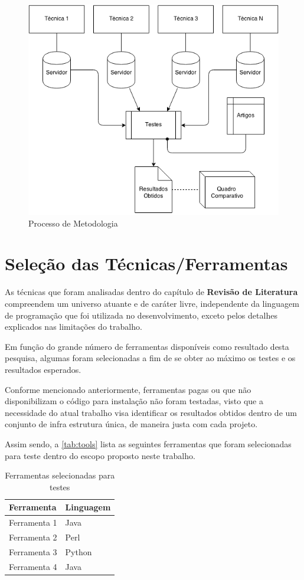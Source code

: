 \begin{figure}
    \centering
    \caption{Processo de Metodologia}
    \label{fig:metodology}
    \includegraphics[width=0.7\linewidth]{./assets/images/metodology}
\end{figure}


\section{Seleção das Técnicas/Ferramentas}
\label{sec:choosen-tools}

As técnicas que foram analisadas dentro do capítulo de \textbf{Revisão de Literatura} compreendem um universo atuante e de caráter livre, independente da linguagem de programação que foi utilizada no desenvolvimento, exceto pelos detalhes explicados nas limitações do trabalho.

Em função do grande número de ferramentas disponíveis como resultado desta pesquisa, algumas foram selecionadas a fim de se obter ao máximo os testes e os resultados esperados.

Conforme mencionado anteriormente, ferramentas pagas ou que não disponibilizam o código para instalação não foram testadas, visto que a necessidade do atual trabalho visa identificar os resultados obtidos dentro de um conjunto de infra estrutura única, de maneira justa com cada projeto.

Assim sendo, a \autoref{tab:tools} lista as seguintes ferramentas que foram selecionadas para teste dentro do escopo proposto neste trabalho.


\begin{table}
    \caption{Ferramentas selecionadas para testes}
    \begin{center}
    	\begin{tabular}{|p{6cm}|p{5cm}|}
			\hline \textbf{Ferramenta} & \textbf{Linguagem} \\ 
			\hline Ferramenta 1 & Java\\
			\hline Ferramenta 2 & Perl\\
			\hline Ferramenta 3 & Python\\
			\hline Ferramenta 4 & Java\\
	    	\hline 
    	\end{tabular} 
    \end{center}
  	\label{tab:tools}
\end{table}

